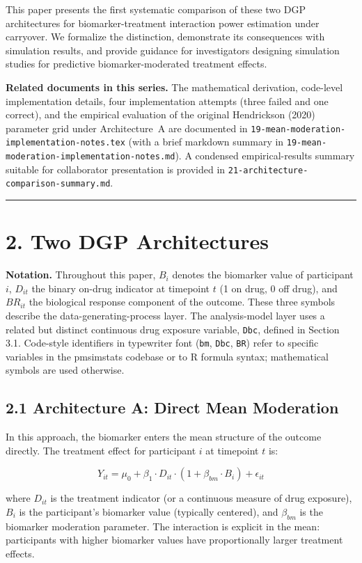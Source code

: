 \documentclass[11pt]{article}
\begin{document}
This paper presents the first systematic comparison of these two
DGP architectures for biomarker-treatment interaction power
estimation under carryover. We formalize the distinction,
demonstrate its consequences with simulation results, and
provide guidance for investigators designing simulation studies
for predictive biomarker-moderated treatment effects.

\textbf{Related documents in this series.} The mathematical
derivation, code-level implementation details, four
implementation attempts (three failed and one correct), and the
empirical evaluation of the original Hendrickson (2020)
parameter grid under Architecture~A are documented in
\texttt{19-mean-moderation-implementation-notes.tex} (with a
brief markdown summary in
\texttt{19-mean-moderation-implementation-notes.md}). A
condensed empirical-results summary suitable for collaborator
presentation is provided in
\texttt{21-architecture-comparison-summary.md}.

\bigskip\noindent\rule{\textwidth}{0.4pt}\bigskip

\section{2. Two DGP Architectures}

\textbf{Notation.} Throughout this paper, $B_i$ denotes the
biomarker value of participant $i$, $D_{it}$ the binary on-drug
indicator at timepoint $t$ (1 on drug, 0 off drug), and
$BR_{it}$ the biological response component of the outcome.
These three symbols describe the data-generating-process layer.
The analysis-model layer uses a related but distinct continuous
drug exposure variable, \texttt{Dbc}, defined in Section 3.1.
Code-style identifiers in typewriter font (\texttt{bm},
\texttt{Dbc}, \texttt{BR}) refer to specific variables in the
pmsimstats codebase or to R formula syntax; mathematical
symbols are used otherwise.

\subsection{2.1 Architecture A: Direct Mean Moderation}

In this approach, the biomarker enters the mean structure of the
outcome directly. The treatment effect for participant $i$ at
timepoint $t$ is:

\[Y_{it} = \mu_0 + \beta_1 \cdot D_{it} \cdot (1 + \beta_{bm}
\cdot B_i) + \epsilon_{it}\]

where $D_{it}$ is the treatment indicator (or a continuous measure
of drug exposure), $B_i$ is the participant's biomarker value
(typically centered), and $\beta_{bm}$ is the biomarker moderation
parameter. The interaction is explicit in the mean: participants
with higher biomarker values have proportionally larger treatment
effects.
\end{document}
